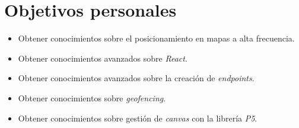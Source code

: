 \section{Objetivos personales}
\begin{itemize}

  \item Obtener conocimientos sobre el posicionamiento en mapas a alta frecuencia.
  \item Obtener conocimientos avanzados sobre \textit{React}.
  \item Obtener conocimientos avanzados sobre la creación de \textit{endpoints}.
  \item Obtener conocimientos sobre \textit{geofencing}.
  \item Obtener conocimientos sobre gestión de \textit{canvas} con la librería \textit{P5}.
\end{itemize}

